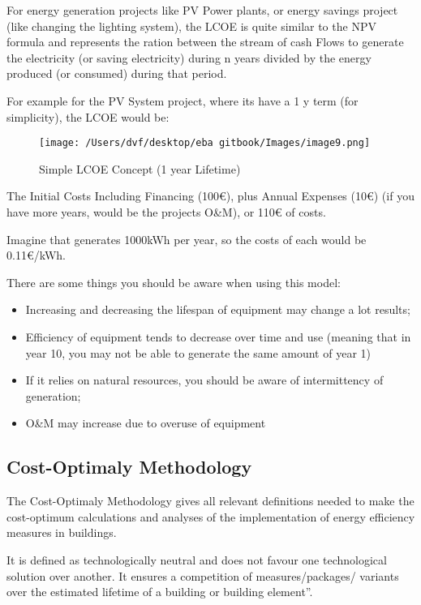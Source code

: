 \documentclass[]{book}
\newcommand{\euro}{€}
\providecommand{\tightlist}{%
  \setlength{\itemsep}{0pt}\setlength{\parskip}{0pt}}
\theoremstyle{definition}
\theoremstyle{definition}
\theoremstyle{definition}
\theoremstyle{remark}
\begin{document}
For energy generation projects like PV Power plants, or energy savings
project (like changing the lighting system), the LCOE is quite similar
to the NPV formula and represents the ration between the stream of cash
Flows to generate the electricity (or saving electricity) during n years
divided by the energy produced (or consumed) during that period.

For example for the PV System project, where its have a 1 y term (for
simplicity), the LCOE would be:

\begin{figure}[htbp]
\centering
\texttt{[image: /Users/dvf/desktop/eba gitbook/Images/image9.png]}
\caption{Simple LCOE Concept (1 year Lifetime)}
\end{figure}

The Initial Costs Including Financing (100\euro{}), plus Annual Expenses
(10\euro{}) (if you have more years, would be the projects O\&M), or
110\euro{} of costs.

Imagine that generates 1000kWh per year, so the costs of each would be
0.11\euro{}/kWh.

There are some things you should be aware when using this model:

\begin{itemize}
\tightlist
\item
  Increasing and decreasing the lifespan of equipment may change a lot
  results;
\item
  Efficiency of equipment tends to decrease over time and use (meaning
  that in year 10, you may not be able to generate the same amount of
  year 1)
\item
  If it relies on natural resources, you should be aware of
  intermittency of generation;
\item
  O\&M may increase due to overuse of equipment
\end{itemize}

\subsection{Cost-Optimaly Methodology}\label{cost-optimaly-methodology}

The Cost-Optimaly Methodology gives all relevant definitions needed to
make the cost-optimum calculations and analyses of the implementation of
energy efficiency measures in buildings.

It is defined as technologically neutral and does not favour one
technological solution over another. It ensures a competition of
measures/packages/ variants over the estimated lifetime of a building or
building element''.
\end{document}
